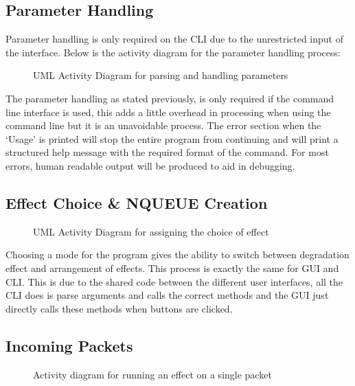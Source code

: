 \subsection{Parameter Handling}
Parameter handling is only required on the CLI due to the unrestricted input of the interface. Below is the activity diagram for the parameter handling process:

\begin{center}
	
	\begin{figure}[h]
		\caption{UML Activity Diagram for parsing and handling parameters}
	\end{figure}	
\end{center}

The parameter handling as stated previously, is only required if the command line interface is used, this adds a little overhead in processing when using the command line but it is an unavoidable process. The error section when the `Usage' is printed will stop the entire program from continuing and will print a structured help message with the required format of the command. For most errors, human readable output will be produced to aid in debugging.

\subsection{Effect Choice \& NQUEUE Creation}

\begin{center}
	
	\begin{figure}[h]
		\caption{UML Activity Diagram for assigning the choice of effect}
	\end{figure}
\end{center}


Choosing a mode for the program gives the ability to switch between degradation effect and arrangement of effects. This process is exactly the same for GUI and CLI. This is due to the shared code between the different user interfaces, all the CLI does is parse arguments and calls the correct methods and the GUI just directly calls these methods when buttons are clicked.

\subsection{Incoming Packets}
\begin{center}
	
	\begin{figure}[h]
		\caption{Activity diagram for running an effect on a single packet}
		\label{ref:incommingAD}
	\end{figure}
\end{center}

